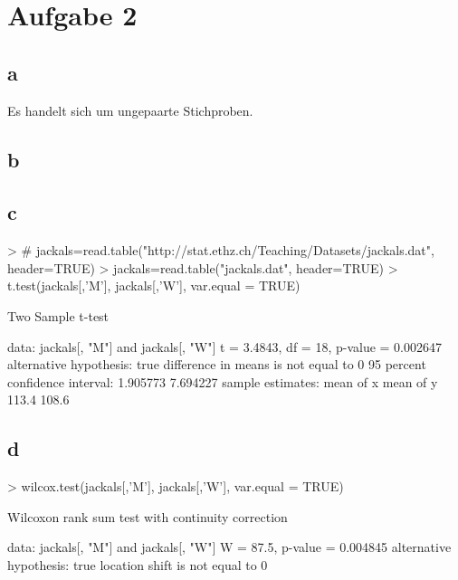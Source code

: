 

\section{Aufgabe 2}

\subsection{a}
Es handelt sich um ungepaarte Stichproben. 

\subsection{b}

\subsection{c}
\begin{Schunk}
\begin{Sinput}
> # jackals=read.table("http://stat.ethz.ch/Teaching/Datasets/jackals.dat", header=TRUE)
> jackals=read.table("jackals.dat", header=TRUE)
> t.test(jackals[,'M'], jackals[,'W'], var.equal = TRUE)
\end{Sinput}
\begin{Soutput}
	Two Sample t-test

data:  jackals[, "M"] and jackals[, "W"] 
t = 3.4843, df = 18, p-value = 0.002647
alternative hypothesis: true difference in means is not equal to 0 
95 percent confidence interval:
 1.905773 7.694227 
sample estimates:
mean of x mean of y 
    113.4     108.6 
\end{Soutput}
\end{Schunk}

\subsection{d}
\begin{Schunk}
\begin{Sinput}
> wilcox.test(jackals[,'M'], jackals[,'W'], var.equal = TRUE)
\end{Sinput}
\begin{Soutput}
	Wilcoxon rank sum test with continuity correction

data:  jackals[, "M"] and jackals[, "W"] 
W = 87.5, p-value = 0.004845
alternative hypothesis: true location shift is not equal to 0 
\end{Soutput}
\end{Schunk}

